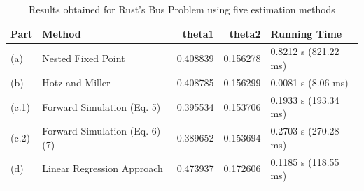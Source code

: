 \begin{table}
\caption{Results obtained for Rust's Bus Problem using five estimation methods}
\label{tab:rust_bus_paola_compact}
\begin{tabular}{llrrl}
\toprule
Part & Method & theta1 & theta2 & Running Time \\
\midrule
(a) & Nested Fixed Point & 0.408839 & 0.156278 & 0.8212 s (821.22 ms) \\
(b) & Hotz and Miller & 0.408785 & 0.156299 & 0.0081 s (8.06 ms) \\
(c.1) & Forward Simulation (Eq. 5) & 0.395534 & 0.153706 & 0.1933 s (193.34 ms) \\
(c.2) & Forward Simulation (Eq. 6)-(7) & 0.389652 & 0.153694 & 0.2703 s (270.28 ms) \\
(d) & Linear Regression Approach & 0.473937 & 0.172606 & 0.1185 s (118.55 ms) \\
\bottomrule
\end{tabular}
\end{table}
